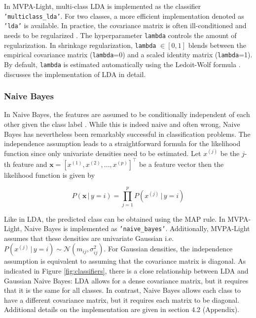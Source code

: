 \documentclass[utf8]{frontiersSCNS} %
\newcommand{\x}{\mathbf{x}}
\newcommand{\xf}[1]{x^{(#1)}} %
\newcommand{\ttt}[1]{\texttt{#1}}
\begin{document}
In MVPA-Light, multi-class LDA is implemented as the classifier  \texttt{'multiclass\_lda'}. For two classes, a more efficient implementation denoted as  \ttt{'lda'} is available. In practice, the covariance matrix is often ill-conditioned and needs to be regularized \citep{Blankertz2011}. The hyperparameter \ttt{lambda} controls the amount of regularization. In shrinkage regularization,  \ttt{lambda} $\in [0,1]$ blends between the empirical covariance matrix (\ttt{lambda}=0) and a scaled identity matrix (\ttt{lambda}=1). By default, \ttt{lambda} is estimated automatically using the Ledoit-Wolf formula \citep{Ledoit2004HoneyMatrix}.  discusses the implementation of LDA in detail.


\subsubsection{Naive Bayes}

In Naive Bayes, the features are assumed to be conditionally independent of each other given the class label \citep{Bishop2007}. While this is indeed naive and often wrong, Naive Bayes has nevertheless been remarkably successful in classification problems. The independence assumption leads to a straightforward formula for the likelihood function since only univariate densities need to be estimated. Let $\xf{j}$ be the $j$-th feature and $\x = [\xf{1}, \xf{2}, ..., \xf{p}]^\top$ be a feature vector then the likelihood function is given by

\begin{equation*}
P(\x\,|\,y = i) = \prod_{j=1}^p P(\xf{j}\,|\,y = i)
\end{equation*}

Like in LDA, the predicted class can be obtained using the MAP rule. In MVPA-Light, Naive Bayes is implemented as \texttt{'naive\_bayes'}. Additionally, MVPA-Light assumes that these densities are univariate Gaussian i.e. $P(\xf{j}\,|\,y = i) \sim \mathcal{N}(m_{ij}, \sigma^2_{ij})$. For Gaussian densities, the independence assumption is equivalent to assuming that the covariance matrix is diagonal. As indicated in Figure \ref{fig:classifiers}, there is a close relationship between LDA and Gaussian Naive Bayes: LDA allows for a dense covariance matrix, but it requires that it is the same for all classes. In contrast, Naive Bayes allows each class to have a different covariance matrix, but it requires each matrix to be diagonal. Additional details on the implementation are given in section 4.2 (Appendix).
\end{document}
